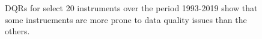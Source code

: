 \begin{figure}
 \caption{DQRs for select 20 instruments over the period 1993-2019 show
	 that some instruements are more prone to data quality issues than
		 the others.}
 \label{fig:dqr_instrument_per_year}
\end{figure}
